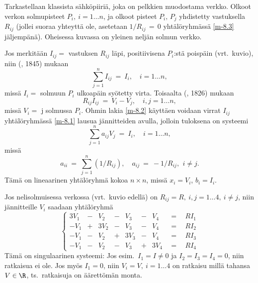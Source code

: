 \begin{multicols}{2}
\parbox{2in}{Tarkastellaan klassista sähköpiiriä, joka on pelkkien  muodostama
verkko. Olkoot verkon solmupisteet $P_i,\ i = 1 \ldots n$, ja olkoot pisteet $P_i,\,P_j$ 
yhdistetty vastuksella $R_{ij}$ (jollei suoraa yhteyttä ole, asetetaan $1/R_{ij}\,=\,0$
yhtälöryhmässä \eqref{m-8.3} jäljempänä). Oheisessa kuvassa on yleinen neljän solmun verkko.}
\begin{figure}[H]
\begin{center}
\end{center}
\end{figure}
\end{multicols}
Jos merkitään $I_{ij} =$  vastuksen $R_{ij}$ läpi, positiivisena $P_i$:stä poispäin
(vrt.\ kuvio), niin 
%
  (, 1845) mukaan
\begin{equation} \label{m-8.1}
\sum_{j=1}^n I_{ij}\ =\ I_i, \quad i = 1 \ldots n,
\end{equation}
missä $I_i =$ solmuun $P_i$ ulkoapäin syötetty virta. Toisaalta
%
  (, 1826) mukaan
\begin{equation} \label{m-8.2}
R_{ij} I_{ij}\ =\ V_i - V_j, \quad i,j = 1 \ldots n,
\end{equation}
missä $V_i =$ j solmussa $P_i$. Ohmin lakia \eqref{m-8.2} käyttäen voidaan virrat
$I_{ij}$ yhtälöryhmässä \eqref{m-8.1} lausua jännitteiden avulla, jolloin tuloksena on systeemi
\begin{equation} \label{m-8.3}
\sum_{j=1}^n a_{ij} V_j\ =\ I_i, \quad i = 1 \ldots n,
\end{equation}
missä
\[
a_{ii}\ =\ \sum_{j=1}^n (1/R_{ij}), \quad a_{ij}\ =\ -1/R_{ij},\,\ i \neq j.
\]
Tämä on lineaarinen yhtälöryhmä kokoa $n \times n$, missä $x_i = V_i$, $b_i = I_i$. 
\begin{Exa} Jos nelisolmuisessa verkossa (vrt.\ kuvio edellä) on 
$R_{ij} = R,\ i,j = 1 \ldots 4,\ i \neq j$, niin jännitteille
$V_i$ saadaan yhtälöryhmä
\[ \left\{ \begin{array}{rrrrrrrrl} 3V_1&-& V_2&-& V_3&-& V_4&\ \ =\ \ &RI_1\\
                                    -V_1&+&3V_2&-& V_3&-& V_4&\ \ =\ \ &RI_2\\
                                    -V_1&-& V_2&+&3V_3&-& V_4&\ \ =\ \ &RI_3\\
                                    -V_1&-& V_2&-& V_3&+&3V_4&\ \ =\ \ &RI_4
\end{array} \right. \]
Tämä on singulaarinen systeemi: Jos esim.\ $I_1 = I \neq 0$ ja $I_2 = I_3 = I_4 = 0$, niin 
ratkaisua ei ole. Jos myös $I_1 = 0$, niin $V_i = V,\ i = 1 \ldots 4$ on ratkaisu millä tahansa
$V \in \R$, ts.\ ratkaisuja on äärettömän monta. \loppu 
\end{Exa}
 
